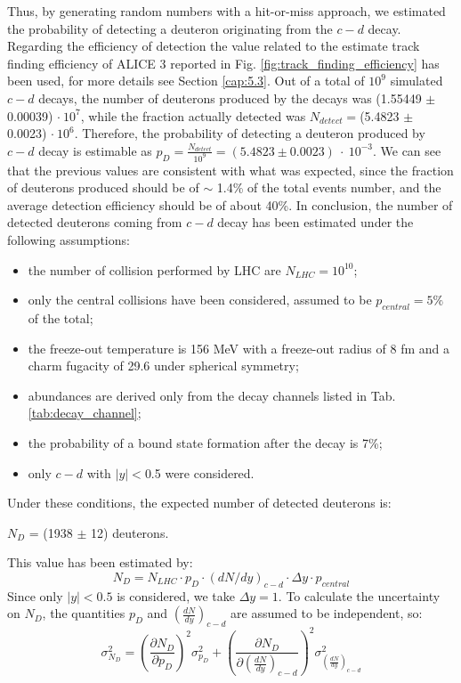 \documentclass[12pt,a4paper]{book}
\begin{document}
	Thus, by generating random numbers with a hit-or-miss approach, we estimated the probability of detecting a deuteron originating from the $c-d$ decay. Regarding the efficiency of detection the value related to the estimate track finding efficiency of ALICE 3 reported in Fig. \ref{fig:track_finding_efficiency} has been used, for more details see Section \ref{cap:5.3}. Out of a total of $10^9$ simulated $c-d$ decays, the number of deuterons produced  by the decays was (1.55449 $\pm$ 0.00039) $\cdot \ 10^7$, while the fraction actually detected was $N_{detect} = $(5.4823 $\pm$ 0.0023) $\cdot \ 10^6$. Therefore, the probability of detecting a deuteron produced by $c-d$ decay is estimable as $p_D = \frac{N_{detect}}{10^9}= (5.4823 \pm 0.0023) \ \cdot \ 10^{-3}$. We can see that the previous values are consistent with what was expected, since the fraction of deuterons produced should be of $\sim$ 1.4\% of the total events number, and the average detection efficiency should be of about 40\%. In conclusion, the number of detected deuterons coming from $c-d$ decay has been estimated under the following assumptions:
	\begin{itemize}
		\item  the number of collision performed by LHC are $N_{LHC} =10^{10}$;
		\item  only the central collisions have been considered, assumed to be $p_{central}=5\%$ of the total;
		\item the freeze-out temperature is 156 MeV with a freeze-out radius of 8 fm and a charm fugacity of 29.6 under spherical symmetry;
		\item abundances are derived only from the decay channels listed in  Tab. \ref{tab:decay_channel};
		\item the probability of a bound state formation after the decay is 7\%;
		\item  only $c-d$ with $|y|<$0.5 were considered.
	\end{itemize}
	 Under these conditions, the expected number of detected deuterons is:
	 \begin{center}
	 	$N_D$ = (1938 $\pm$ 12) deuterons.
	 \end{center}
	  This value has been estimated by:
	\begin{equation}
		N_D = N_{LHC} \cdot p_D \cdot (dN/dy)_{c-d} \cdot \Delta y \cdot p_{central}
	\end{equation}
 	Since only $|y|<0.5$ is considered, we take $\Delta y = 1$.
	To calculate the uncertainty on $N_D$, the quantities $p_D$ and $\left(\frac{dN}{dy}\right)_{c-d}$ are assumed to be independent, so:
	\begin{equation}
		\sigma_{N_D}^2 = 
		\left(\frac{\partial N_D}{\partial p_D}\right)^2 \sigma_{p_D}^2
		+ \left(\frac{\partial N_D}{\partial \left(\frac{dN}{dy}\right)_{c-d}}\right)^2 
		\sigma_{\left(\frac{dN}{dy}\right)_{c-d}}^2
	\end{equation}
	
\end{document}

